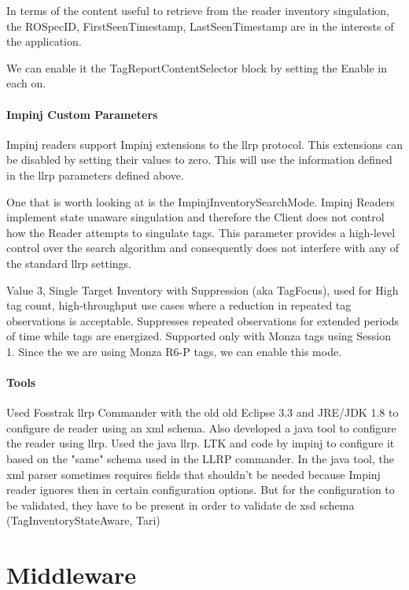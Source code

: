 In terms of the content useful to retrieve from the reader inventory singulation, the ROSpecID, FirstSeenTimestamp, LastSeenTimestamp are in the interests of the application.

We can enable it the TagReportContentSelector block by setting the Enable in each on.

\paragraph{Impinj Custom Parameters}

Impinj readers support Impinj extensions to the \ac{llrp} protocol. This extensions can be disabled by setting their values to zero. This will use the information defined in the \ac{llrp} parameters defined above.

One that is worth looking at is the ImpinjInventorySearchMode.
Impinj Readers implement state unaware singulation and therefore the Client does not control how the Reader attempts to singulate tags. This parameter provides a high-level control over the search algorithm and consequently does not interfere with any of the standard \ac{llrp} settings.~\cite[sec. 4.3.3]{ImpinjOctaneLLRP}

Value 3, Single Target Inventory with Suppression (aka TagFocus), used for High tag count, high-throughput use cases where a reduction in repeated tag observations is acceptable. Suppresses repeated observations for extended periods of time while tags are energized. Supported only with Monza tags using Session 1. Since the we are using Monza R6-P tags, we can enable this mode.

\paragraph{Tools}

Used Fosstrak \ac{llrp} Commander with the old old Eclipse 3.3 and JRE/JDK 1.8 to configure de reader using an xml schema.
Also developed a java tool to configure the reader using \ac{llrp}. Used the java llrp. LTK and code by impinj to configure it based on the "same" schema used in the LLRP commander.
In the java tool, the xml parser sometimes requires fields that shouldn't be needed because Impinj reader ignores then in certain configuration options. But for the configuration to be validated, they have to be present in order to validate de xsd schema (TagInventoryStateAware, Tari)

\section{Middleware}

